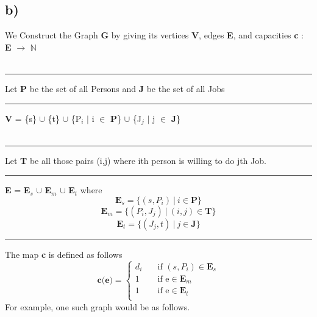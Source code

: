 \documentclass{report}
\begin{document}
 \subsection*{b)}
 We Construct the Graph \textbf{G} by giving its  vertices \textbf{V}, edges \textbf{E}, and capacities \textbf{c} : \textbf{E} $\rightarrow$ $\mathbb{N}$\\
 \vspace*{1.2em}\\
 \rule[0.5cm]{2cm}{0pt} Let \textbf{P} be the set of all Persons and \textbf{J} be the set of all Jobs\\
 \rule[0.5mm]{2cm}{0pt} \textbf{V} = \{s\} $\cup$ \{t\} $\cup$ \{P$_i$ $|$ i $\in$ \textbf{P}\} $\cup$ \{J$_j$ $|$ j $\in$ \textbf{J}\} \\
 \vspace*{1.2em}\\
 \rule[0.5mm]{2cm}{0pt} Let \textbf{T} be all those pairs (i,j) where ith person is willing to do jth Job.\\
 \rule[0.5mm]{2cm}{0pt} \textbf{E} = \textbf{E$_{s}$} $\cup$ \textbf{E$_{m}$} $\cup$  \textbf{E$_{t}$} where\\
 \begin{equation*}
     \mathbf{E}_s = \{(s,P_i)\  |\  i \in \mathbf{P}\} 
 \end{equation*}
 \begin{equation*}
     \mathbf{E}_m = \{(P_i,J_j)\  | \ (i,j) \in \mathbf{T} \}
 \end{equation*}
 \begin{equation*}
     \mathbf{E}_t = \{(J_j,t)\ |\  j \in \mathbf{J}\}
 \end{equation*}
  \rule[0.5mm]{2cm}{0pt} The map \textbf{c} is defined as follows \\
   \[   
    \textbf{c(e)} = 
         \begin{cases}
           d_i &\quad\text{if }(s,P_i) \in \mathbf{E}_s\\
           1 &\quad\text{if e} \in \mathbf{E}_m\\
           1 &\quad\text{if e} \in \mathbf{E}_t\\
         \end{cases}
    \]
 For example, one such graph would be as follows.\\
\end{document}
